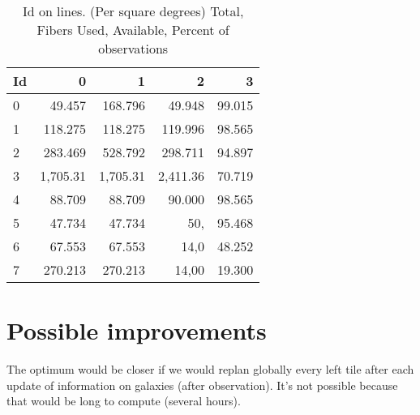 \documentclass{article}
\begin{document}
\begin{table}[h]\begin{center}
\caption{Id on lines. (Per square degrees) Total, Fibers Used, Available, Percent of observations}
\begin{tabular}{l|rrrr} 
   Id &          0  &           1  &           2  &           3 \\ \hline
   0  &      49.457  &     168.796  &      49.948  &      99.015   \\
   1  &     118.275  &     118.275  &     119.996  &      98.565   \\
   2  &     283.469  &     528.792  &     298.711  &      94.897   \\
   3  &    1,705.31  &    1,705.31  &    2,411.36  &      70.719   \\
   4  &      88.709  &      88.709  &      90.000  &      98.565   \\
   5  &      47.734  &      47.734  &         50,  &      95.468   \\
   6  &      67.553  &      67.553  &        14,0  &      48.252   \\
   7  &     270.213  &     270.213  &       14,00  &      19.300   \\
\end{tabular}\end{center}
 \end{table}


\section{Possible improvements}
The optimum would be closer if we would replan globally every left tile after each update of information on galaxies (after observation). It's not possible because that would be long to compute (several hours).
\end{document}

